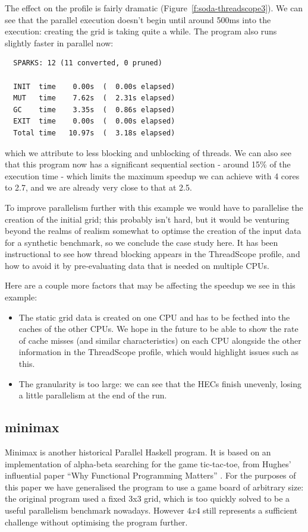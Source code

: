\documentclass[twocolumn,9pt]{sigplanconf}
\let\cite=\citep
\begin{document}
The effect on the profile is fairly dramatic
(Figure~\ref{f:soda-threadscope3}).  We can see that the parallel
execution doesn't begin until around 500ms into the execution:
creating the grid is taking quite a while.  The program also runs
slightly faster in parallel now:

\begin{verbatim}
  SPARKS: 12 (11 converted, 0 pruned)

  INIT  time    0.00s  (  0.00s elapsed)
  MUT   time    7.62s  (  2.31s elapsed)
  GC    time    3.35s  (  0.86s elapsed)
  EXIT  time    0.00s  (  0.00s elapsed)
  Total time   10.97s  (  3.18s elapsed)
\end{verbatim}
which we attribute to less blocking and unblocking of threads.  We can
also see that this program now has a significant sequential section -
around 15\% of the execution time - which limits the maximum speedup
we can achieve with 4 cores to 2.7, and we are already very close to
that at 2.5.

To improve parallelism further with this example we would have to
parallelise the creation of the initial grid; this probably isn't
hard, but it would be venturing beyond the realms of realism somewhat
to optimse the creation of the input data for a synthetic benchmark,
so we conclude the case study here.  It has been instructional to see
how thread blocking appears in the ThreadScope profile, and how to
avoid it by pre-evaluating data that is needed on multiple CPUs.

Here are a couple more factors that may be affecting the speedup we
see in this example:

\begin{itemize}
\item The static grid data is created on one CPU and has to be fecthed
  into the caches of the other CPUs.  We hope in the future to be able
  to show the rate of cache misses (and similar characteristics) on
  each CPU alongside the other information in the ThreadScope profile,
  which would highlight issues such as this.
\item The granularity is too large: we can see that the HECs finish
  unevenly, losing a little parallelism at the end of the run.
\end{itemize}

\subsection{minimax}

Minimax is another historical Parallel Haskell program.  It is based
on an implementation of alpha-beta searching for the game tic-tac-toe,
from Hughes' influential paper ``Why Functional Programming Matters''
\cite{why}.  For the purposes of this paper we have generalised the
program to use a game board of arbitrary size: the original program
used a fixed 3x3 grid, which is too quickly solved to be a useful
parallelism benchmark nowadays.  However $4x4$ still represents a
sufficient challenge without optimising the program further.
\end{document}
